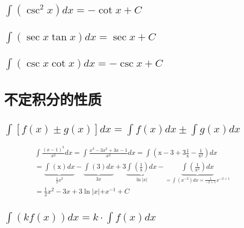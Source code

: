 \documentclass[UTF8]{ctexart}
\begin{document}
	\subsection{$\int (\csc^2 x) dx = - \cot x + C$}
	
	\subsection{$ \int (\sec x \tan x) dx = \sec x + C$}
	

	
	\subsection{$\int (\csc x \cot x) dx = -\csc x + C$}
	




	
	\section{不定积分的性质}
	
	\subsection{$\int [ f(x) \pm g(x) ] dx = \int f(x) dx \pm \int g(x) dx$}
	
	
	\begin{myEnvSample}
		\begin{align*}
	&\int_{}^{}{\frac{\left( x-1 \right) ^3}{x^2}}dx=\int_{}^{}{\frac{x^3-3x^2+3x-1}{x^2}dx}=\int_{}^{}{\left( \text{x}-3+3\frac{1}{\text{x}}-\frac{1}{\text{x}^2} \right)}dx\\
&=\underset{\frac{1}{2}x^2}{\underbrace{\int_{}^{}{\left( \text{x} \right)}dx}}-\underset{3x}{\underbrace{\int_{}^{}{\left( 3 \right)}dx}}+3\underset{\ln\text{|}x|}{\underbrace{\int_{}^{}{\left( \frac{1}{\text{x}} \right)}dx}}-\underset{=\int_{}^{}{\left( x^{-2} \right)}dx=\frac{1}{-2+1}x^{-2+1}}{\underbrace{\int_{}^{}{\left( \frac{1}{\text{x}^2} \right)}dx}}\\
&=\frac{1}{2}x^2-3x+3\ln\text{|}x|+x^{-1}+C
		\end{align*}
	\end{myEnvSample}
	
	
	
	\subsection{$\int (k f(x)) dx = k \cdot \int f(x) dx$}
	
\end{document}

